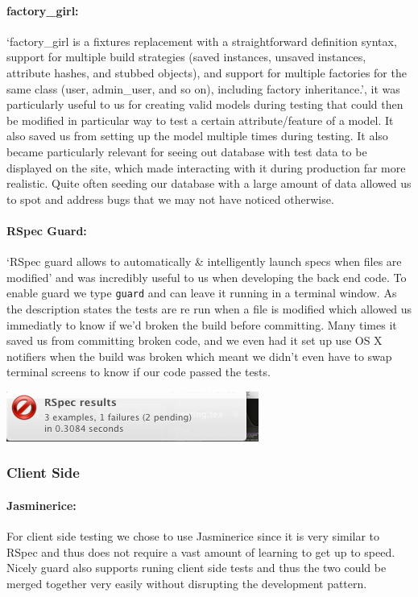     \paragraph{factory\_girl:}
      `factory\_girl is a fixtures replacement with a straightforward definition syntax, support for multiple build strategies (saved instances, unsaved instances, attribute hashes, and stubbed objects), and support for multiple factories for the same class (user, admin\_user, and so on), including factory inheritance.'\cite{factory-girl}, it was particularly useful to us for creating valid models during testing that could then be modified in particular way to test a certain attribute/feature of a model.
      It also saved us from setting up the model multiple times during testing.
      It also became particularly relevant for seeing out database with test data to be displayed on the site, which made interacting with it during production far more realistic. Quite often seeding our database with a large amount of data allowed us to spot and address bugs that we may not have noticed otherwise.

    \paragraph{RSpec Guard:}
      `RSpec guard allows to automatically \& intelligently launch specs when files are modified'\cite{guard} and was incredibly useful to us when developing the back end code. To enable guard we type \verb!guard! and can leave it running in a terminal window. As the description states the tests are re run when a file is modified which allowed us immediatly to know if we'd broken the build before committing.
      Many times it saved us from committing broken code, and we even had it set up use OS X notifiers when the build was broken which meant we didn't even have to swap terminal screens to know if our code passed the tests.

      \includegraphics[scale=0.5]{images/project_management/testing/guard_osx}

  \subsubsection{Client Side}
    \paragraph{Jasminerice:}
      For client side testing we chose to use Jasminerice since it is very similar to RSpec and thus does not require a vast amount of learning to get up to speed. Nicely guard also supports runing client side tests and thus the two could be merged together very easily without disrupting the development pattern.

